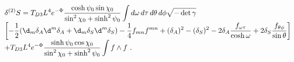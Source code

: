 \begin{equation}
\label{quadR}
\begin{array}{l}
\displaystyle\delta^{(2)}S = T_{D3}L^4e^{-\Phi}
             \frac{\cosh\psi_0\sin\chi_0}{\sin^2\chi_0+\sinh^2\psi_0}
             \int d\omega\,d\tau\,d\theta\,d\phi\sqrt{-\det\gamma}\\
\displaystyle\left[
  -\frac{1}{2}(\d_m\delta_A\d^m\delta_A + \d_m\delta_S\d^m\delta_S)
  -\frac{1}{4}f_{mn}f^{mn} +(\delta_A)^2 -(\delta_S)^2
  -2\delta_A\frac{f_{\omega\tau}}{\cosh\omega}
  +2\delta_S\frac{f_{\theta\phi}}{\sin\theta} \right] \\
\displaystyle+T_{D3}L^4e^{-\Phi}
  \frac{\sinh\psi_0\cos\chi_0}{\sin^2\chi_0+\sinh^2\psi_0}\int f\wedge f
\ .
\end{array}
\end{equation}

